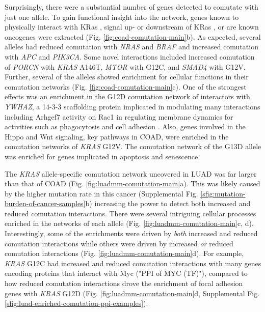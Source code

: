 \documentclass[english, 10pt, letterpaper]{article}
\newcommand{\KRAS}{\emph{KRAS}}
\newcommand{\kras}{KRas}
\begin{document}
Surprisingly, there were a substantial number of genes detected to comutate with just one allele.
To gain functional insight into the network, genes known to physically interact with \kras{} \cite{Kovalski2019}, signal up- or downstream of \kras{} \cite{Kanehisa2017, Kanehisa2016KEGGAnnotation.}, or are known oncogenes \cite{Bamford2004TheWebsite., Sondka2018} were extracted (Fig. \ref{fig:coad-comutation-main}b).
As expected, several alleles had reduced comutation with \emph{NRAS} and \emph{BRAF} and increased comutation with \emph{APC} and \emph{PIK3CA}. Some novel interactions included increased comutation of \emph{PORCN} with \KRAS{} A146T, \emph{MTOR} with G12C, and \emph{SMAD4} with G12V.
Further, several of the alleles showed enrichment for cellular functions in their comutation networks (Fig. \ref{fig:coad-comutation-main}c).
One of the strongest effects was an enrichment in the G12D comutation network of interactors with \emph{YWHAZ}, a 14-3-3 scaffolding protein implicated in modulating many interactions including Arhgef7 activity on Rac1 in regulating membrane dynamics for activities such as phagocytosis and cell adhesion \cite{Angrand2006TransgenicSignaling.}.
Also, genes involved in the Hippo and Wnt signaling, key pathways in COAD, were enriched in the comutation networks of \KRAS{} G12V.
The comutation network of the G13D allele was enriched for genes implicated in apoptosis and senescence.


The \KRAS{} allele-specific comutation network uncovered in LUAD was far larger than that of COAD (Fig. \ref{fig:luadmm-comutation-main}a).
This was likely caused by the higher mutation rate in this cancer (Supplemental Fig. \ref{sfig:mutation-burden-of-cancer-samples}b) increasing the power to detect both increased and reduced comutation interactions.
There were several intriguing cellular processes enriched in the networks of each allele (Fig. \ref{fig:luadmm-comutation-main}c, d).
Interestingly, some of the enrichments were driven by \emph{both} increased and reduced comutation interactions while others were driven by increased \emph{or} reduced comutation interactions (Fig. \ref{fig:luadmm-comutation-main}d).
For example, \KRAS{} G12C had increased and reduced comutation interactions with many genes encoding proteins that interact with Myc ("PPI of MYC (TF)"), compared to how reduced comutation interactions drove the enrichment of focal adhesion genes with \KRAS{} G12D (Fig. \ref{fig:luadmm-comutation-main}d, Supplemental Fig. \ref{sfig:luad-enriched-comutation-ppi-examples}).
\end{document}
